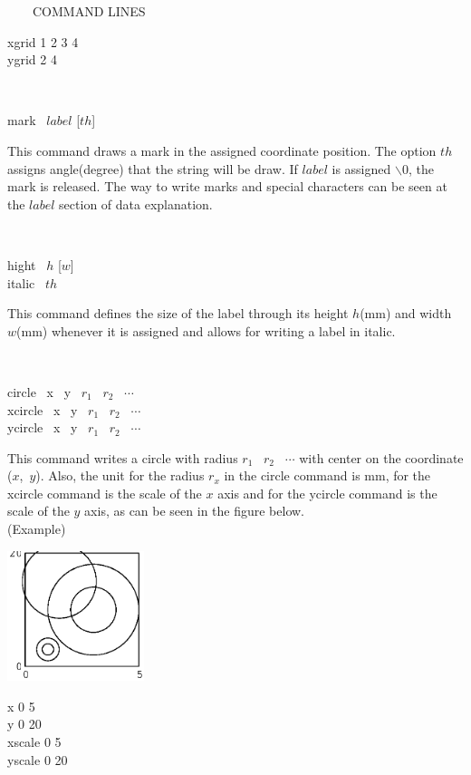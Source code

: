 \begin{qsection}{\ ~~~COMMAND LINES}
\begin{minipage}[t]{9cm}
\begin{minipage}[b]{4.5cm}
\vspace{3mm}
xgrid 1 2 3 4\\
ygrid 2 4
\vspace*{1cm}
\end{minipage}
\end{minipage}\\


\begin{minipage}[t]{5.5cm}
mark ~$label$ [$th$]
\end{minipage}
\begin{minipage}[t]{9cm}
This command draws a mark in the assigned coordinate position.
The option $th$ assigns angle(degree) that the string will be draw.
If $label$ is assigned $\backslash 0$, the mark is released.
The way to write marks and special characters can be seen
at the $label$ section of data explanation.
\end{minipage}\\

\begin{minipage}[t]{5.5cm}
hight ~$h$ [$w$]\\
italic ~$th$
\end{minipage}
\begin{minipage}[t]{9cm}
This command defines the size of the label through its
height $h$(mm) and width $w$(mm) whenever it is assigned
and allows for writing a label in italic.
\end{minipage}\\

\begin{minipage}[t]{5.5cm}
circle ~x ~y ~$r_1$ ~$r_2$ ~$\cdots$\\
xcircle ~x ~y ~$r_1$ ~$r_2$ ~$\cdots$\\
ycircle ~x ~y ~$r_1$ ~$r_2$ ~$\cdots$

\end{minipage}
\begin{minipage}[t]{9cm}
This command writes a circle with radius $r_1$ ~$r_2$ ~$\cdots$
with center on the coordinate ($x$,~$y$).
Also, the unit for the radius $r_x$ in the circle command is mm,
for the xcircle command is the scale of the $x$ axis and
for the ycircle command is the scale of the $y$ axis,
as can be seen in the figure below.\\
(Example)\\
\begin{minipage}[t]{4.3cm}
 \includegraphics[width=4cm]{fig/circle.eps}
\end{minipage}
\begin{minipage}[b]{4.5cm}
\baselineskip 5pt
x 0 5\\
y 0 20\\
xscale 0 5\\
yscale 0 20


\end{minipage}
\end{minipage}
\end{qsection}
